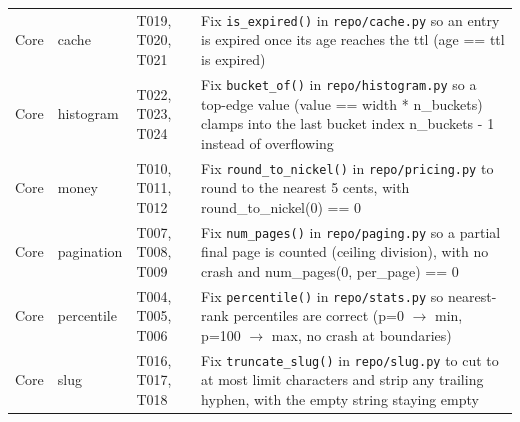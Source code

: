 \begin{table}[t]
\begin{tabular}{@{}llp{}p{}@{}}
Core & cache & T019, T020, T021 & Fix \texttt{is\_expired()} in \texttt{repo/cache.py} so an entry is expired once its age reaches the ttl (age == ttl is expired) \\
Core & histogram & T022, T023, T024 & Fix \texttt{bucket\_of()} in \texttt{repo/histogram.py} so a top-edge value (value == width * n\_buckets) clamps into the last bucket index n\_buckets - 1 instead of overflowing \\
Core & money & T010, T011, T012 & Fix \texttt{round\_to\_nickel()} in \texttt{repo/pricing.py} to round to the nearest 5 cents, with round\_to\_nickel(0) == 0 \\
Core & pagination & T007, T008, T009 & Fix \texttt{num\_pages()} in \texttt{repo/paging.py} so a partial final page is counted (ceiling division), with no crash and num\_pages(0, per\_page) == 0 \\
Core & percentile & T004, T005, T006 & Fix \texttt{percentile()} in \texttt{repo/stats.py} so nearest-rank percentiles are correct (p=0 $\rightarrow$ min, p=100 $\rightarrow$ max, no crash at boundaries) \\
Core & slug & T016, T017, T018 & Fix \texttt{truncate\_slug()} in \texttt{repo/slug.py} to cut to at most limit characters and strip any trailing hyphen, with the empty string staying empty \\
\bottomrule
\end{tabular}
\end{table}
